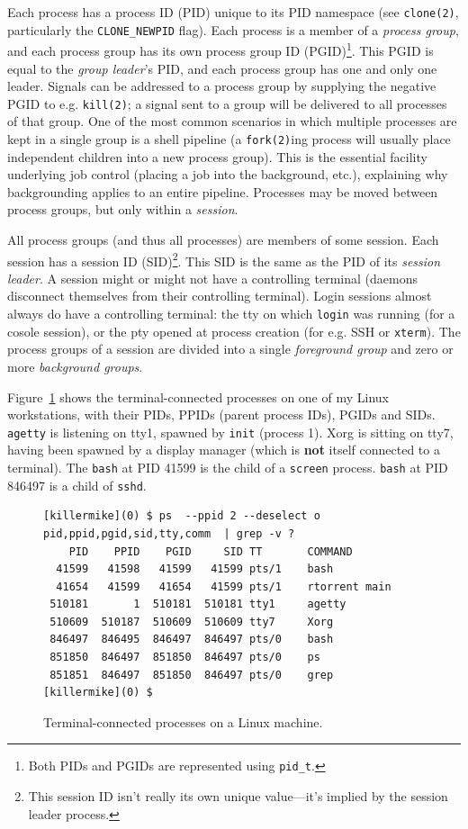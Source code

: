 Each process has a process ID (PID) unique to its PID namespace (see
\texttt{clone(2)}\cite{clone2}, particularly the \texttt{CLONE\_NEWPID} flag).
Each process is a member of a \textit{process group}, and each process group
has its own process group ID (PGID)\footnote{Both PIDs and PGIDs are represented using \texttt{pid\_t}.}.
This PGID is equal to the \textit{group leader}'s PID, and each process group
has one and only one leader. Signals can be addressed to a process group by
supplying the negative PGID to e.g. \texttt{kill(2)}; a signal sent to a group
will be delivered to all processes of that group. One of the most common
scenarios in which multiple processes are kept in a single group is a shell
pipeline (a \texttt{fork(2)}ing process will usually place independent children
into a new process group). This is the essential facility underlying job control
(placing a job into the background, etc.), explaining why backgrounding
applies to an entire pipeline. Processes may be moved between process groups,
but only within a \textit{session}.

All process groups (and thus all processes) are members of some session. Each
session has a session ID (SID)\footnote{This session ID isn't really its own
unique value---it's implied by the session leader process.}. This SID
is the same as the PID of its \textit{session leader}. A session might or might
not have a controlling terminal (daemons disconnect themselves from their
controlling terminal). Login sessions almost always do have a controlling
terminal: the tty on which \texttt{login} was running (for a cosole session),
or the pty opened at process creation (for e.g. SSH or \texttt{xterm}). The
process groups of a session are divided into a single \textit{foreground group}
and zero or more \textit{background groups}.

Figure~\ref{fig:termprocs} shows the terminal-connected processes on one of
my Linux workstations, with their PIDs, PPIDs (parent process IDs), PGIDs
and SIDs. \texttt{agetty} is listening on tty1, spawned by
\texttt{init} (process 1). Xorg is sitting on tty7, having been spawned by a
display manager (which is \textbf{not} itself connected to a terminal). The
\texttt{bash} at PID 41599 is the child of a \texttt{screen} process.
\texttt{bash} at PID 846497 is a child of \texttt{sshd}.

\begin{figure}[!htbp]
  \centering
\begin{verbatim}
[killermike](0) $ ps  --ppid 2 --deselect o pid,ppid,pgid,sid,tty,comm  | grep -v ?
    PID    PPID    PGID     SID TT       COMMAND
  41599   41598   41599   41599 pts/1    bash
  41654   41599   41654   41599 pts/1    rtorrent main
 510181       1  510181  510181 tty1     agetty
 510609  510187  510609  510609 tty7     Xorg
 846497  846495  846497  846497 pts/0    bash
 851850  846497  851850  846497 pts/0    ps
 851851  846497  851850  846497 pts/0    grep
[killermike](0) $
\end{verbatim}
\caption{Terminal-connected processes on a Linux machine.}
\label{fig:termprocs}
\end{figure}

